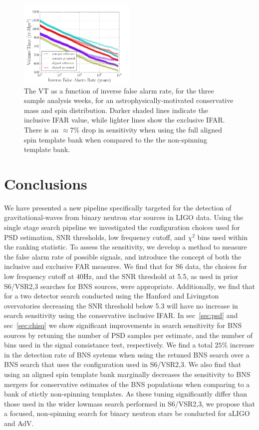 \begin{figure}
\centering
\includegraphics[width=0.5\textwidth]{papers/bns_o1_dev/figures/rest_combined.png}
\caption{\label{fig:rest} 
The VT as a function of inverse false alarm rate, for the
three sample analysis weeks, for an astrophysically-motivated conservative mass and spin distribution. Darker shaded lines indicate the inclusive IFAR value, while lighter lines show the exclusive IFAR. There is an $\approx 7\%$ drop in sensitivity when using the full aligned spin template bank when compared to the the non-spinning
template bank.}
\end{figure}

\section{Conclusions}

We have presented a new pipeline specifically targeted for the detection of gravitational-waves from binary neutron star sources in LIGO data. Using the single stage search pipeline we investigated the configuration choices used for PSD estimation, SNR thresholds, low frequency cutoff, and $\chi^2$ bins used within the ranking statistic. To assess the sensitivity, we develop a method to measure the false alarm rate of possible signals, and introduce the concept of both the inclusive and exclusive FAR measures. We find that for S6 data, the choices for low frequency cutoff at 40Hz, and the SNR threshold at 5.5, as used in prior S6/VSR2,3 searches for BNS sources, were appropriate. Additionally, we find that for a two detector search conducted using the Hanford and Livingston overvatories decreasing the SNR threshold below 5.3 will have no increase in search sensitivity using the conservative inclusive IFAR. In sec~\ref{sec:psd} and sec~\ref{sec:chisq} we show significant improvements in search sensitivity for BNS sources by retuning the number of PSD samples per estimate, and the number of bins used in the signal consistance test, respectively. We find a total $25\%$ increase in the detection rate of BNS systems when using the retuned BNS search over a BNS search that uses the configuration used in S6/VSR2,3. We also find that using an aligned spin template bank marginally decreases the sensitivity 
to BNS mergers for conservative estimates of the BNS populations when comparing to a bank of stictly non-spinning templates. As these tuning significantly differ than those used in the wider lowmass search performed in S6/VSR2,3, we propose that a focused, non-spinning search for binary neutron stars be conducted for aLIGO and AdV.

\label{sec:conclusions}
